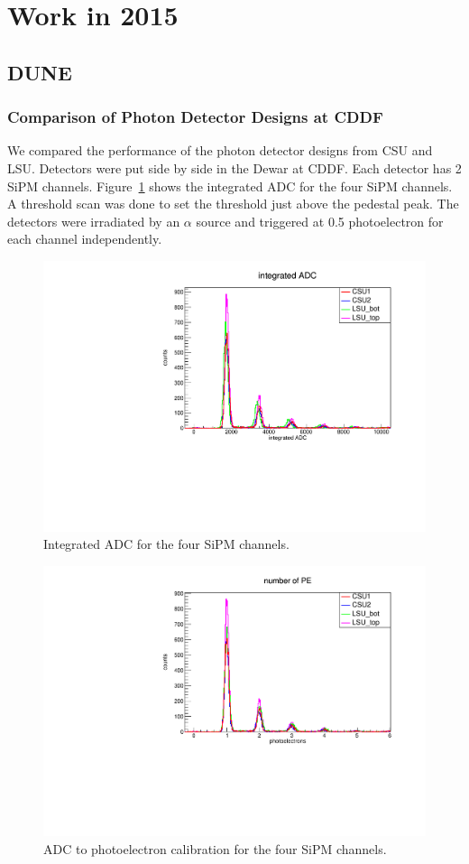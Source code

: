 \documentclass[12pt,a4paper,final]{iopart}
\begin{document}
\section{Work in 2015}

\subsection{DUNE}

\subsubsection{Comparison of Photon Detector Designs at CDDF}
We compared the performance of the photon detector designs from CSU and LSU. Detectors were put side by side in the Dewar at CDDF. Each detector has 2 SiPM channels. Figure~\ref{fig:cddfadc} shows the integrated ADC for the four SiPM channels. A threshold scan was done to set the threshold just above the pedestal peak. The detectors were irradiated by an $\alpha$ source and triggered at 0.5 photoelectron for each channel independently.

\begin{figure}
  \centering
  \includegraphics[angle=270,origin=c,width=.7\textwidth]{figures/2015/integratedADC.pdf}
  \caption{Integrated ADC for the four SiPM channels.}
  \label{fig:cddfadc}
\end{figure}

\begin{figure}
  \centering
  \includegraphics[angle=270,origin=c,width=.7\textwidth]{figures/2015/calibrated_spectra.pdf}
  \caption{ADC to photoelectron calibration for the four SiPM channels.}
  \label{fig:cddfcalibrated}
\end{figure}
\end{document}
